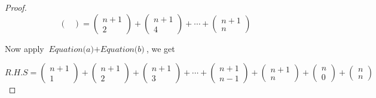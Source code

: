 \documentclass[12pt]{article}
\begin{document}
\begin{proof}
\[\begin{pmatrix}
          \end{pmatrix} 
            =  \begin{pmatrix}
            n+1  \\
            2
        \end{pmatrix}  + \begin{pmatrix}
                  n+1 \\
                  4
              
              \end{pmatrix} + \cdots + \begin{pmatrix}
                                           n+1 \\
                                           n 
        
             
              \end{pmatrix} \]
    
    \vspace*{0.3cm}
    \hspace*{1.2cm}
    Now apply $\textit{Equation(a)} + \textit{Equation(b)} $, we get

    \[ R.H.S = \begin{pmatrix}
        n+1  \\
        1
    \end{pmatrix}  + \begin{pmatrix}
              n+1 \\
              2
          
          \end{pmatrix} +  \begin{pmatrix}
                                       n+1 \\
                                       3 
    
          \end{pmatrix} 
           + \cdots + \begin{pmatrix}
                  n+1 \\
                  n-1
              
              \end{pmatrix} + \begin{pmatrix}
                                           n+1 \\
                                           n 
        
             
              \end{pmatrix} + \begin{pmatrix}
                n \\
                0
              \end{pmatrix} + \begin{pmatrix}
                n \\
                n
              \end{pmatrix}
              \]
    

\end{proof}
\end{document}
